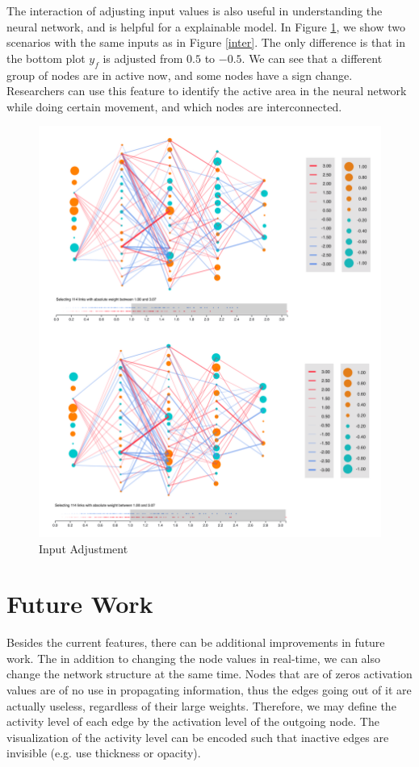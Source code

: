 \documentclass[sigchi]{acmart}
\begin{document}
The interaction of adjusting input values is also useful in understanding the neural network, and is helpful for a explainable model. In Figure \ref{adjust}, we show two scenarios with the same inputs as in Figure \ref{inter}. The only difference is that in the bottom plot $y_f$ is adjusted from $0.5$ to $-0.5$. We can see that a different group of nodes are in active now, and some nodes have a sign change. Researchers can use this feature to identify the active area in the neural network while doing certain movement, and which nodes are interconnected. 

\begin{figure}[h]
  \centering
  \includegraphics[width=\linewidth]{compare.pdf}
  \caption{Input Adjustment}
  \label{adjust}
\end{figure}

\section{Future Work}
Besides the current features, there can be additional improvements in future work. The in addition to changing the node values in real-time, we can also change the network structure at the same time. Nodes that are of zeros activation values are of no use in propagating information, thus the edges going out of it are actually useless, regardless of their large weights. Therefore, we may define the activity level of each edge by the activation level of the outgoing node. The visualization of the activity level can be encoded such that inactive edges are invisible (e.g. use thickness or opacity).
\end{document}
